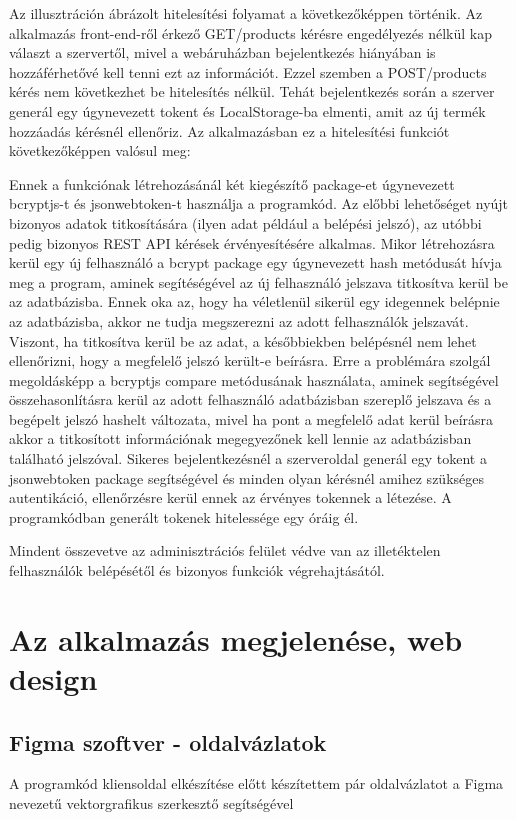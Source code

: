 Az illusztráción ábrázolt hitelesítési folyamat a következőképpen történik. Az alkalmazás front-end-ről érkező GET/products kérésre engedélyezés nélkül kap választ a szervertől, mivel a webáruházban bejelentkezés hiányában is hozzáférhetővé kell tenni ezt az információt. Ezzel szemben a POST/products kérés nem következhet be hitelesítés nélkül. Tehát bejelentkezés során a szerver generál egy úgynevezett tokent és LocalStorage-ba elmenti, amit az új termék hozzáadás kérésnél ellenőriz. Az alkalmazásban ez a hitelesítési funkciót következőképpen valósul meg:

Ennek a funkciónak létrehozásánál két kiegészítő package-et úgynevezett bcryptjs-t és jsonwebtoken-t használja a programkód. Az előbbi lehetőséget nyújt bizonyos adatok titkosítására (ilyen adat például a belépési jelszó), az utóbbi pedig bizonyos REST API kérések érvényesítésére alkalmas. Mikor létrehozásra kerül egy új felhasználó a bcrypt package egy úgynevezett hash metódusát hívja meg a program, aminek segítéségével az új felhasználó jelszava titkosítva kerül be az adatbázisba. Ennek oka az, hogy ha véletlenül sikerül egy idegennek belépnie az adatbázisba, akkor ne tudja megszerezni az adott felhasználók jelszavát. Viszont, ha titkosítva kerül be az adat, a későbbiekben belépésnél nem lehet ellenőrizni, hogy a megfelelő jelszó került-e beírásra. Erre a problémára szolgál megoldásképp a bcryptjs compare metódusának használata, aminek segítségével összehasonlításra kerül az adott felhasználó adatbázisban szereplő jelszava és a begépelt jelszó hashelt változata, mivel ha pont a megfelelő adat kerül beírásra akkor a titkosított információnak megegyezőnek kell lennie az adatbázisban található jelszóval. Sikeres bejelentkezésnél a szerveroldal generál egy tokent a jsonwebtoken package segítségével és minden olyan kérésnél amihez szükséges autentikáció, ellenőrzésre kerül ennek az érvényes tokennek a létezése. A programkódban generált tokenek hitelessége egy óráig él.

Mindent összevetve az adminisztrációs felület védve van az illetéktelen felhasználók belépésétől és bizonyos funkciók végrehajtásától.


\section{Az alkalmazás megjelenése, web design} %


\subsection{Figma szoftver - oldalvázlatok}
A programkód kliensoldal elkészítése előtt készítettem pár oldalvázlatot a Figma nevezetű vektorgrafikus szerkesztő segítségével


